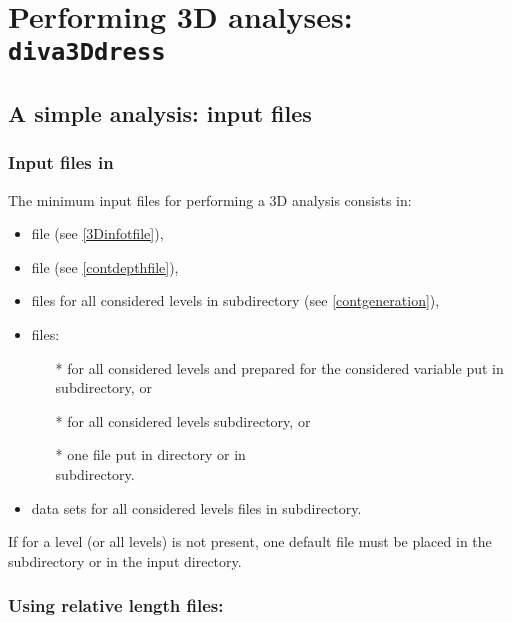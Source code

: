 \section{Performing 3D analyses: \texttt{diva3Ddress}}

\subsection{A simple analysis: input files}

\subsubsection{Input files in }

The minimum input files for performing a \diva 3D analysis consists in:

\begin{itemize}
\item {} file (see \ref{3Dinfotfile}),
\item {} file (see \ref{contdepthfile}),
\item {} files for all considered levels in  subdirectory (see \ref{contgeneration}),
\item {} files:
\begin{itemize}
\item[*]  for all considered levels and prepared for the considered variable put in  subdirectory, or
\item[*]  for all considered levels  subdirectory, or
\item[*] one  file put in   directory or in\\ 
 subdirectory.
\end{itemize}
\item data sets for all considered levels  files in  subdirectory.
\end{itemize}


\btips
If for a level (or all levels)  is not present, one default  file must be placed in the  subdirectory or in the input directory.
\etips

\subsubsection{ Using relative length files:}

